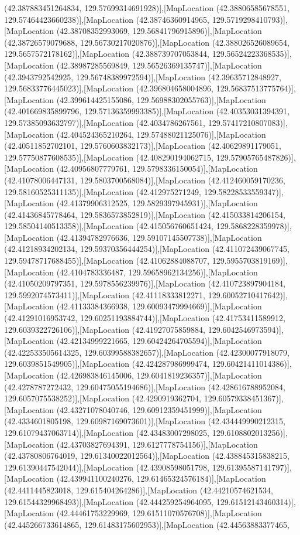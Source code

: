 (42.387883451264834, 129.57699314691928)],[MapLocation (42.38806585678551, 129.57464423660238)],[MapLocation (42.38746360914965, 129.5719298410793)],[MapLocation (42.38708352993069, 129.56841796915896)],[MapLocation (42.38726579079688, 129.56730217020876)],[MapLocation (42.388026526089654, 129.5657572178162)],[MapLocation (42.388739707053844, 129.56524223368535)],[MapLocation (42.38987285569849, 129.56526369135747)],[MapLocation (42.3943792542925, 129.56748389972594)],[MapLocation (42.39635712848927, 129.56833776445023)],[MapLocation (42.396804658004896, 129.56837513775764)],[MapLocation (42.399614425155086, 129.56988302055763)],[MapLocation (42.401669835899796, 129.57136359993385)],[MapLocation (42.40353031394391, 129.57385093632797)],[MapLocation (42.4034786267561, 129.57417210807083)],[MapLocation (42.404524365210264, 129.57488021125076)],[MapLocation (42.40511852702101, 129.5760603832173)],[MapLocation (42.40629891179051, 129.57750877608535)],[MapLocation (42.408290194062715, 129.57905765487826)],[MapLocation (42.40956807779761, 129.5798336150054)],[MapLocation (42.41078006447131, 129.5803700568084)],[MapLocation (42.412460059170236, 129.58160525311135)],[MapLocation (42.412975271249, 129.58228533559347)],[MapLocation (42.41379906312525, 129.5829397945931)],[MapLocation (42.41436845778464, 129.5836573852819)],[MapLocation (42.415033814206154, 129.58504140513358)],[MapLocation (42.415056760651424, 129.5868228359978)],[MapLocation (42.41394782976636, 129.59107145507738)],[MapLocation (42.41218934202134, 129.59370356444254)],[MapLocation (42.411072439067745, 129.59478717688455)],[MapLocation (42.41062884088707, 129.5955703819169)],[MapLocation (42.4104783336487, 129.59658962134256)],[MapLocation (42.41050209797351, 129.5978556239976)],[MapLocation (42.410723897904184, 129.5992074573411)],[MapLocation (42.41118333812271, 129.60052710417642)],[MapLocation (42.41133384366938, 129.60093479994669)],[MapLocation (42.41291016953742, 129.60251193884744)],[MapLocation (42.41753411589912, 129.6039322726106)],[MapLocation (42.41927075859884, 129.6042546973594)],[MapLocation (42.42134999221665, 129.60424264705594)],[MapLocation (42.422533505614325, 129.60399588382657)],[MapLocation (42.42300077918079, 129.6039851549905)],[MapLocation (42.424287986999474, 129.60421411014386)],[MapLocation (42.426983846145006, 129.6041819236357)],[MapLocation (42.4278787272432, 129.60475055194686)],[MapLocation (42.428616788952084, 129.6057075538252)],[MapLocation (42.4290919362704, 129.60579338451367)],[MapLocation (42.43271078040746, 129.60912359451999)],[MapLocation (42.4334601805198, 129.60987169073601)],[MapLocation (42.434449990212315, 129.61079437063714)],[MapLocation (42.43483007298025, 129.6108802013256)],[MapLocation (42.43703827694391, 129.6127778754156)],[MapLocation (42.43780806764019, 129.61340022012564)],[MapLocation (42.438845315838215, 129.61390447542044)],[MapLocation (42.43908598051798, 129.61395587141797)],[MapLocation (42.439941100240276, 129.61465324576184)],[MapLocation (42.4411445823018, 129.615404264286)],[MapLocation (42.44210574621534, 129.61544329968493)],[MapLocation (42.444259254964095, 129.61512143460314)],[MapLocation (42.44461753229969, 129.61511070576708)],[MapLocation (42.445266733614865, 129.61483175602953)],[MapLocation (42.44563883377465, 